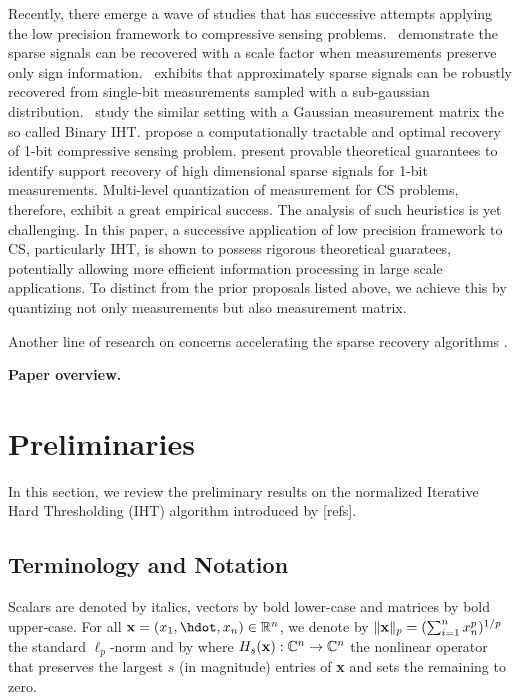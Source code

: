 \documentclass{article}
\begin{document}
Recently, there emerge a wave of studies that has successive attempts applying the low precision framework to compressive sensing problems.~\cite{boufounos20091bitcs} demonstrate the sparse signals can be recovered with a scale factor when measurements preserve only sign information.~\cite{ai20121bitcs, davenport20121bit} exhibits that approximately sparse signals can be robustly recovered from single-bit measurements sampled with a sub-gaussian distribution.~\cite{jacques20111bit, laska20111bitcs} study the similar setting with a Gaussian measurement matrix the so called Binary IHT. \cite{plan20111bitcs, plan20121bitcs} propose a computationally tractable and optimal recovery of 1-bit compressive sensing problem. \cite{recht20121bitcs, gopi20131bitcs} present provable theoretical guarantees to identify support recovery of high dimensional sparse signals for 1-bit measurements. Multi-level quantization of measurement for CS problems, therefore, exhibit a great empirical success. The analysis of such heuristics is yet challenging. In this paper, a successive application of low precision framework to CS, particularly IHT, is shown to possess rigorous theoretical guaratees, potentially allowing more efficient information processing in large scale applications. To distinct from the prior proposals listed above, we achieve this by quantizing not only measurements but also measurement matrix.

Another line of research on concerns accelerating the sparse recovery algorithms \cite{blumensath2011aiht, wei2015fiht, blanchard2013iht, cevher2011ht, liu2017dualiht}. 



{\bf Paper overview. }
\section{Preliminaries}
In this section, we review the preliminary results on the normalized Iterative Hard Thresholding (IHT) algorithm introduced by [refs].
\subsection{Terminology and Notation}
Scalars are denoted by italics, vectors by bold lower-case and matrices by bold upper-case. For all ${\bf x}= (x_1, \hdot, x_n) \in \mathbb{R}^n$, we denote by $\|{\bf x}\|_p = (\sum_{i=1}^n x_n^p)^{1/p}$ the standard ${\ell}_p$-norm and by
where $H_s({\bf x}): \mathbb{C}^n \rightarrow \mathbb{C}^n$ the nonlinear operator that preserves the largest $s$ (in magnitude) entries of {\bf x} and sets the remaining to zero. 
\end{document}

